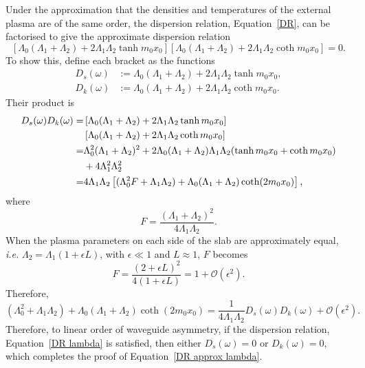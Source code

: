 Under the approximation that the densities and temperatures of the external plasma are of the same order, the dispersion relation, Equation~\eqref{DR}, can be factorised to give the approximate dispersion relation
\begin{equation}
\left[\Lambda_0(\Lambda_1+\Lambda_2)+2\Lambda_1\Lambda_2\tanh{m_0x_0}\right]\left[\Lambda_0(\Lambda_1+\Lambda_2)+2\Lambda_1\Lambda_2\coth{m_0x_0}\right]=0. \label{DR approx lambda}
\end{equation}
To show this, define each bracket as the functions
\begin{align}
D_s(\omega) &:= \Lambda_0(\Lambda_1 + \Lambda_2) + 2\Lambda_1\Lambda_2\tanh{m_0x_0}, \\
D_k(\omega) &:= \Lambda_0 (\Lambda_1 + \Lambda_2) + 2\Lambda_1\Lambda_2\coth{m_0x_0}.
\end{align}
Their product is
\begin{align}
D_s(\omega)D_k(\omega) = & \left[ \Lambda_0(\Lambda_1 + \Lambda_2) + 2\Lambda_1\Lambda_2\tanh{m_0x_0} \right] \notag \\
& \left[ \Lambda_0 (\Lambda_1 + \Lambda_2) + 2\Lambda_1\Lambda_2\coth{m_0x_0} \right] \notag \\
=& \Lambda_0^2 (\Lambda_1 + \Lambda_2)^2 + 2\Lambda_0(\Lambda_1 + \Lambda_2)\Lambda_1\Lambda_2(\tanh{m_0x_0} + \coth{m_0x_0}) \notag \\
& + 4\Lambda_1^2\Lambda_2^2 \notag \\
=& 4\Lambda_1\Lambda_2 \left[ (\Lambda_0^2F + \Lambda_1\Lambda_2) + \Lambda_0(\Lambda_1 + \Lambda_2)\coth(2m_0x_0) \right],
\end{align}
where
\begin{equation}
F = \frac{(\Lambda_1 + \Lambda_2)^2}{4\Lambda_1\Lambda_2}.
\end{equation}
When the plasma parameters on each side of the slab are approximately equal, \textit{i.e.} $\Lambda_2 = \Lambda_1 (1 + \epsilon L)$, with $\epsilon \ll 1$ and $L \approx 1$, $F$ becomes
\begin{equation}
F = \frac{(2 + \epsilon L)^2}{4(1 + \epsilon L)} = 1 + \mathcal{O}(\epsilon^2).
\end{equation}
Therefore, 
\begin{equation}
(\Lambda_0^2 + \Lambda_1\Lambda_2) + \Lambda_0(\Lambda_1 + \Lambda_2)\coth(2m_0x_0) = \frac{1}{4\Lambda_1\Lambda_2} D_s(\omega) D_k(\omega) + \mathcal{O}(\epsilon^2).
\end{equation}
Therefore, to linear order of waveguide asymmetry, if the dispersion relation, Equation~\eqref{DR lambda} is satisfied, then either $D_s(\omega) = 0$ or $D_k(\omega) = 0$, which completes the proof of Equation~\eqref{DR approx lambda}.

